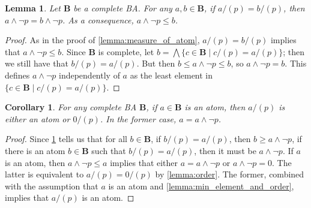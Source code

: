 \documentclass{article}
\newtheorem{theorem}{Theorem}
\newtheorem{lemma}{Lemma}
\newtheorem{corollary}{Corollary}
\theoremstyle{definition}
\theoremstyle{remark}
\DeclareMathOperator{\WMC}{WMC}
\begin{document}
\begin{lemma} \label{lemma:minimal_in_quotient} %
  Let $\mathbf{B}$ be a complete BA. For any $a, b \in \mathbf{B}$, if $a/(p) =
  b/(p)$, then $a \land \neg p = b \land \neg p$. As a consequence, $a \land
  \neg p \le b$.
\end{lemma}
\begin{proof} %
  As in the proof of \cref{lemma:measure_of_atom}, $a/(p) = b/(p)$ implies that
  $a \land \neg p \le b$. Since $\mathbf{B}$ is complete, let $b = \bigwedge \{
  c \in \mathbf{B} \mid c/(p) = a/(p) \}$; then we still have that $b/(p) =
  a/(p)$. But then $b \le a \land \neg p \le b$, so $a \land \neg p = b$. This
  defines $a \land \neg p$ independently of $a$ as the least element in $\{c \in
  \mathbf{B} \mid c/(p) = a/(p) \}$.
\end{proof}

\begin{corollary}
  For any complete BA $\mathbf{B}$, if $a \in \mathbf{B}$ is an atom, then
  $a/(p)$ is either an atom or $0/(p)$. In the former case, $a = a \land \neg
  p$.
\end{corollary}
\begin{proof}
  Since \cref{lemma:minimal_in_quotient} tells us that for all $b \in
  \mathbf{B}$, if $b/(p) = a/(p)$, then $b \ge a \land \neg p$, if there is an
  atom $b \in \mathbf{B}$ such that $b/(p) = a/(p)$, then it must be $a \land
  \neg p$. If $a$ is an atom, then $a \land \neg p \le a$ implies that either $a
  = a \land \neg p$ or $a \land \neg p = 0$. The latter is equivalent to $a/(p)
  = 0/(p)$ by \cref{lemma:order}. The former, combined with the assumption that
  $a$ is an atom and \cref{lemma:min_element_and_order}, implies that $a/(p)$ is
  an atom.
\end{proof}



\end{document}
